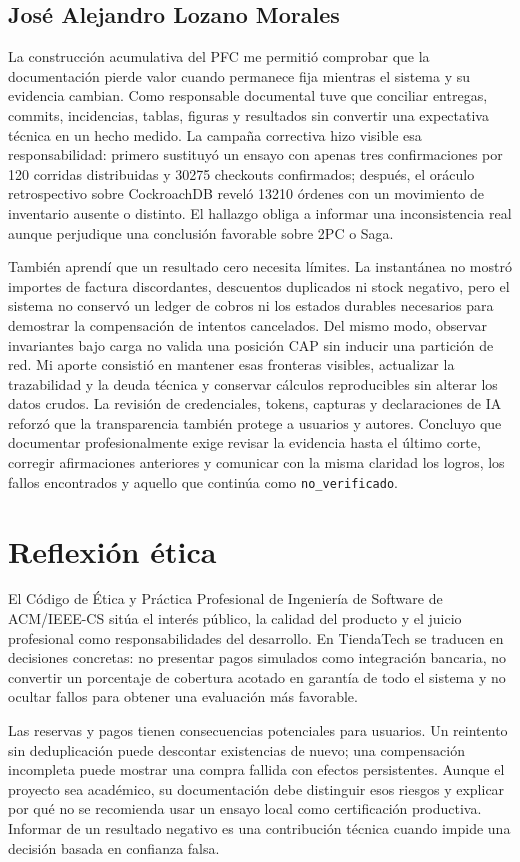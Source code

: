 \documentclass[12pt,a4paper]{article}
\newcommand{\seccion}[1]{\section{#1}}
\begin{document}
\subsection{José Alejandro Lozano Morales}
La construcción acumulativa del PFC me permitió comprobar que la documentación pierde valor cuando permanece fija mientras el sistema y su evidencia cambian. Como responsable documental tuve que conciliar entregas, commits, incidencias, tablas, figuras y resultados sin convertir una expectativa técnica en un hecho medido. La campaña correctiva hizo visible esa responsabilidad: primero sustituyó un ensayo con apenas tres confirmaciones por 120 corridas distribuidas y 30275 checkouts confirmados; después, el oráculo retrospectivo sobre CockroachDB reveló 13210 órdenes con un movimiento de inventario ausente o distinto. El hallazgo obliga a informar una inconsistencia real aunque perjudique una conclusión favorable sobre 2PC o Saga.

También aprendí que un resultado cero necesita límites. La instantánea no mostró importes de factura discordantes, descuentos duplicados ni stock negativo, pero el sistema no conservó un ledger de cobros ni los estados durables necesarios para demostrar la compensación de intentos cancelados. Del mismo modo, observar invariantes bajo carga no valida una posición CAP sin inducir una partición de red. Mi aporte consistió en mantener esas fronteras visibles, actualizar la trazabilidad y la deuda técnica y conservar cálculos reproducibles sin alterar los datos crudos. La revisión de credenciales, tokens, capturas y declaraciones de IA reforzó que la transparencia también protege a usuarios y autores. Concluyo que documentar profesionalmente exige revisar la evidencia hasta el último corte, corregir afirmaciones anteriores y comunicar con la misma claridad los logros, los fallos encontrados y aquello que continúa como \texttt{no\_verificado}.


\seccion{Reflexión ética}
El Código de Ética y Práctica Profesional de Ingeniería de Software de ACM/IEEE-CS \cite{acmieee} sitúa el interés público, la calidad del producto y el juicio profesional como responsabilidades del desarrollo. En TiendaTech se traducen en decisiones concretas: no presentar pagos simulados como integración bancaria, no convertir un porcentaje de cobertura acotado en garantía de todo el sistema y no ocultar fallos para obtener una evaluación más favorable.

Las reservas y pagos tienen consecuencias potenciales para usuarios. Un reintento sin deduplicación puede descontar existencias de nuevo; una compensación incompleta puede mostrar una compra fallida con efectos persistentes. Aunque el proyecto sea académico, su documentación debe distinguir esos riesgos y explicar por qué no se recomienda usar un ensayo local como certificación productiva. Informar de un resultado negativo es una contribución técnica cuando impide una decisión basada en confianza falsa.
\end{document}
